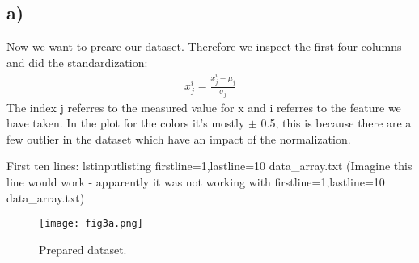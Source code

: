 \subsection{a)}
Now we want to preare our dataset. Therefore we inspect the first four columns and did the standardization:
\begin{align}
    x_j^{i} = \frac{x_j^{i} - \mu_j}{\sigma_j}
\end{align}
The index j referres to the measured value for x and i referres to the feature we have taken. In the plot for the colors it's mostly $\pm$ 0.5, this is because there are a few outlier in the dataset which have an impact of the normalization.

First ten lines:
lstinputlisting firstline=1,lastline=10 data_array.txt
(Imagine this line would work  - apparently it was not working with firstline=1,lastline=10 data_array.txt)

\begin{figure}[h!]
    \centering
    \texttt{[image: fig3a.png]}
    \caption{Prepared dataset.}
\end{figure}




